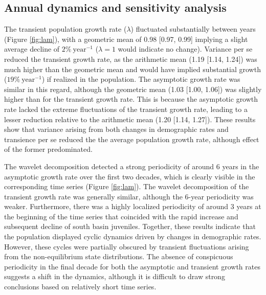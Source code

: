 \subsection*{Annual dynamics and sensitivity analysis} 

The transient population growth rate ($\lambda$) fluctuated substantially between years
(Figure \ref{fig:lam}),
with a geometric mean of 0.98 [0.97, 0.99] implying a slight average decline
of $2\%~\text{year}^{-1}$ ($\lambda = 1$ would indicate no change).
Variance per se reduced the transient growth rate, 
as the arithmetic mean (1.19 [1.14, 1.24]) was much higher than the geometric mean
and would have implied substantial growth ($19\%~\text{year}^{-1}$)
if realized in the population.
The asymptotic growth rate was similar in this regard,
although the geometric mean (1.03 [1.00, 1.06]) was slightly higher 
than for the transient growth rate.
This is because the asymptotic growth rate lacked the extreme fluctuations 
of the transient growth rate,
leading to a lesser reduction relative to the arithmetic mean (1.20 [1.14, 1.27]).
These results show that variance arising from both changes in demographic
rates and transience per se reduced the the average population growth rate,
although effect of the former predominated.

The wavelet decomposition detected a strong periodicity of around 6 years
in the asymptotic growth rate over the first two decades, 
which is clearly visible in the corresponding time series (Figure \ref{fig:lam}).
The wavelet decomposition of the transient growth rate was generally similar,
although the 6-year periodicity was weaker.
Furthermore, there was a highly localized periodicity of around 3 years 
at the beginning of the time series 
that coincided with the rapid increase and subsequent decline of south basin juveniles.
Together, these results indicate that the population displayed cyclic dynamics 
driven by changes in demographic rates.
However, these cycles were partially obscured by transient fluctuations arising 
from the non-equilibrium state distributions.
The absence of conspicuous periodicity in the final decade
for both the asymptotic and transient growth rates 
suggests a shift in the dynamics, 
although it is difficult to draw strong conclusions 
based on relatively short time series.

